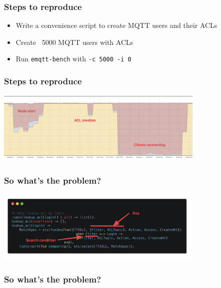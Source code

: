 \documentclass{beamer}
\begin{document}
\begin{frame}
    \frametitle{Steps to reproduce}

    \begin{itemize}
        \item Write a convenience script to create MQTT users and their ACLs
        \item Create ~5000 MQTT users with ACLs
        \item Run \lstinline{emqtt-bench} with \lstinline{-c 5000 -i 0}
    \end{itemize}
\end{frame}

\begin{frame}
    \frametitle{Steps to reproduce}

    \begin{center}
        \includegraphics[width=10cm, keepaspectratio]{images/reproduce.png}
    \end{center}
\end{frame}

\begin{frame}
    \frametitle{So what's the problem?}

    \begin{center}
        \includegraphics[width=10cm, keepaspectratio]{images/old-lookup-code.png}
    \end{center}
\end{frame}

\begin{frame}
    \frametitle{So what's the problem?}

\end{frame}
\end{document}
